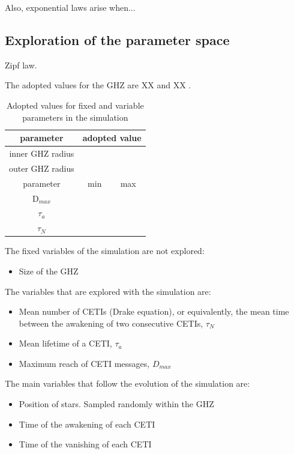 \documentclass[useAMS,usenatbib]{mnras}
\begin{document}
Also, exponential laws arise when...




\subsection{Exploration of the parameter space}


Zipf law.

The adopted values for the GHZ are XX and XX \citep{Lineweaver2004}.

        

\begin{table}
\begin{tabular}{ccc}
\hline
   parameter & \multicolumn{2}{c}{adopted value}\hfill \\
\hline
   inner GHZ radius & \multicolumn{2}{c}{}\\
   outer GHZ radius & \multicolumn{2}{c}{}\\
\hline
   parameter & min & max \\
\hline
   D$_{max}$ & & \\
   $\tau_{a}$ & & \\
   $\tau_{N}$ & & \\
\hline
\end{tabular}
\caption{Adopted values for fixed and variable parameters in the
   simulation}
\label{T_parameters}
\end{table}

                


The fixed variables of the simulation are not explored:


\begin{itemize}
   \item Size of the GHZ
\end{itemize}


The variables that are explored with the simulation are:

\begin{itemize}
   \item Mean number of CETIs (Drake equation), or equivalently, the
      mean time between the awakening of two consecutive CETIs,
      $\tau_N$
   \item Mean lifetime of a CETI, $\tau_a$
   \item Maximum reach of CETI messages, $D_{max}$
\end{itemize}

The main variables that follow the evolution of the simulation are:

\begin{itemize}
   \item Position of stars.  Sampled randomly within the GHZ
   \item Time of the awakening of each CETI
   \item Time of the vanishing of each CETI
\end{itemize}
\end{document}
